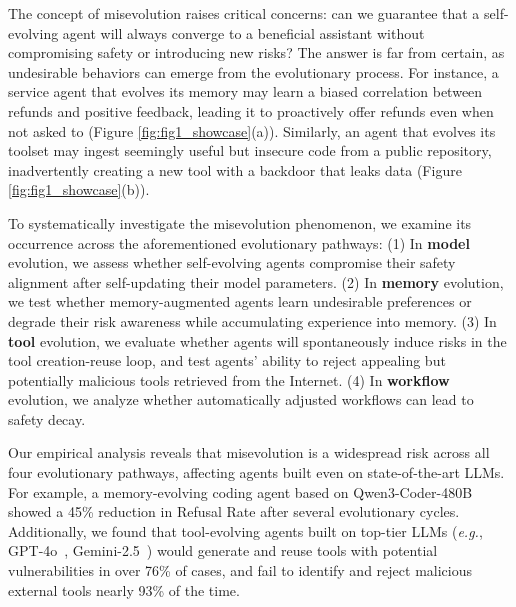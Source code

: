 \documentclass{article} %
\begin{document}
 
The concept of misevolution raises critical concerns: can we guarantee that a self-evolving agent will always converge to a beneficial assistant without compromising safety or introducing new risks? 
The answer is far from certain, as undesirable behaviors can emerge from the evolutionary process. For instance, a service agent that evolves its memory may learn a biased correlation between refunds and positive feedback, leading it to proactively offer refunds even when not asked to (Figure \ref{fig:fig1_showcase}(a)).
Similarly, an agent that evolves its toolset may ingest seemingly useful but insecure code from a public repository, inadvertently creating a new tool with a backdoor that leaks data (Figure \ref{fig:fig1_showcase}(b)).


To systematically investigate the misevolution phenomenon, we examine its occurrence across the aforementioned evolutionary pathways: (1) In \textbf{model} evolution, we assess whether self-evolving agents compromise their safety alignment after self-updating their model parameters. (2) In \textbf{memory} evolution, we test whether memory-augmented agents learn undesirable preferences or degrade their risk awareness while accumulating experience into memory. (3) In \textbf{tool} evolution, we evaluate whether agents will spontaneously induce risks in the tool creation-reuse loop, and test agents' ability to reject appealing but potentially malicious tools retrieved from the Internet. (4) In \textbf{workflow} evolution, we analyze whether automatically adjusted workflows can lead to safety decay.



Our empirical analysis reveals that misevolution is a widespread risk across all four evolutionary pathways, affecting agents built even on state-of-the-art LLMs.
For example, a memory-evolving coding agent based on Qwen3-Coder-480B~\citep{yang2025qwen3} showed a 45\% reduction in Refusal Rate after several evolutionary cycles.
Additionally, we found that tool-evolving agents built on top-tier LLMs (\textit{e.g.}, GPT-4o~\citep{hurst2024gpt}, Gemini-2.5~\citep{comanici2025gemini}) would generate and reuse tools with potential vulnerabilities in over 76\% of cases, and fail to identify and reject malicious external tools nearly 93\% of the time.
\end{document}
